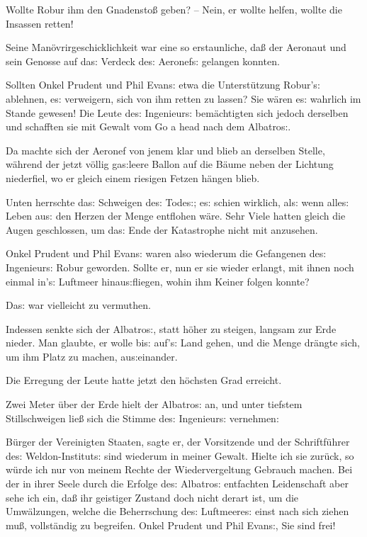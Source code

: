 \documentclass[oneside,12pt]{book}
\newenvironment{antiqua}{\normalfont}{}
\newcommand{\s}{s:}
\begin{document}
Wollte Robur ihm den Gnadensto{\ss} geben? -- Nein, er wollte helfen,
wollte die Insassen retten!

Seine Man\"ovrirgeschicklichkeit war eine so erstaunliche, da{\ss}
der Aeronaut und sein Genosse auf da{\s} Verdeck de{\s} Aeronef{\s}
gelangen konnten.

Sollten Onkel Prudent und Phil Evan{\s} etwa die Unterst\"utzung
Robur'{\s} ablehnen, e{\s} verweigern, sich von ihm retten zu lassen?
Sie w\"aren e{\s} wahrlich im Stande gewesen! Die Leute de{\s}
Ingenieur{\s} bem\"achtigten sich jedoch derselben und schafften sie
mit Gewalt vom \begin{antiqua}Go a head\end{antiqua} nach dem
{\glqq}Albatro{\s}{\grqq}.

Da machte sich der Aeronef von jenem klar und blieb an derselben
Stelle, w\"ahrend der jetzt v\"ollig ga{\s}leere Ballon auf die
B\"aume neben der Lichtung niederfiel, wo er gleich einem riesigen
Fetzen h\"angen blieb.

Unten herrschte da{\s} Schweigen de{\s} Tode{\s}; e{\s} schien
wirklich, al{\s} wenn alle{\s} Leben au{\s} den Herzen der Menge
entflohen w\"are. Sehr Viele hatten gleich die Augen geschlossen, um
da{\s} Ende der Katastrophe nicht mit anzusehen.

Onkel Prudent und Phil Evan{\s} waren also wiederum die Gefangenen
de{\s} Ingenieur{\s} Robur geworden. Sollte er, nun er sie wieder
erlangt, mit ihnen noch einmal in'{\s} Luftmeer hinau{\s}fliegen,
wohin ihm Keiner folgen konnte?

Da{\s} war vielleicht zu vermuthen.

Indessen senkte sich der {\glqq}Albatro{\s}{\grqq}, statt h\"oher zu
steigen, langsam zur Erde nieder. Man glaubte, er wolle bi{\s}
auf'{\s} Land gehen, und die Menge dr\"angte sich, um ihm Platz zu
machen, au{\s}einander.

Die Erregung der Leute hatte jetzt den h\"ochsten Grad erreicht.

Zwei Meter \"uber der Erde hielt der {\glqq}Albatro{\s}{\grqq} an,
und unter tiefstem Stillschweigen lie{\ss} sich die Stimme de{\s}
Ingenieur{\s} vernehmen:

{\glqq}B\"urger der Vereinigten Staaten, sagte er, der Vorsitzende
und der Schriftf\"uhrer de{\s} Weldon-Institut{\s} sind wiederum in
meiner Gewalt. Hielte ich sie zur\"uck, so w\"urde ich nur von meinem
Rechte der Wiedervergeltung Gebrauch machen. Bei der in ihrer Seele
durch die Erfolge de{\s} {\glqq}Albatro{\s}{\grqq} entfachten
Leidenschaft aber sehe ich ein, da{\ss} ihr geistiger Zustand doch
nicht derart ist, um die Umw\"alzungen, welche die Beherrschung
de{\s} Luftmeere{\s} einst nach sich ziehen mu{\ss}, vollst\"andig zu
begreifen. Onkel Prudent und Phil Evan{\s}, Sie sind frei!{\grqq}
\end{document}
